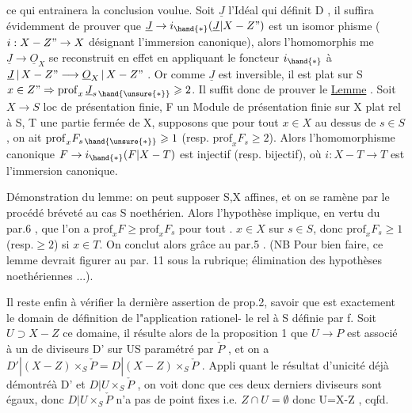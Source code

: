 
ce qui entrainera la conclusion voulue. Soit $\underline{J}$ l'Idéal qui définit
D , il suffira évidemment de prouver que $\underline{J}\to i_{\hand{*}}(\underline{J}|X-Z")$ est un isomor
phisme ($i:X-Z"\to X$ désignant l'immersion canonique), alors l'homomorphis
me $\underline{J}\to\underline{O}_X$ se reconstruit en effet en appliquant le foncteur $i_{\hand{*}}$ à
$\underline{J}\,|\,X-Z" \longrightarrow \underline{O}_X\,|\,X-Z"$ . Or comme $\underline{J}$ est inversible, il est plat sur S 
 $x\in Z" \Rightarrow \mathrm{prof}_x\,\underline{J}_{s\,\hand{\unsure{*}}} \geqslant 2$. Il suffit donc de prouver le
\uline{Lemme} . Soit $X\to S$ loc de présentation finie, F un Module de présentation
finie sur X plat rel à S, T une partie fermée de X, supposons que pour
tout $x\in X$ au dessus de $s\in S$, on ait \hand{\unsure{/}} $\mathrm{prof}_x F_{s\,\hand{\unsure{*}}}\geqslant 1$ (resp. $\mathrm{prof}_x F_s \geqslant 2$).
Alors l'homomorphisme canonique $F\to i_{\hand{*}}(F|X-T)$ est injectif (resp.
bijectif), où $i:X-T\to T$ est l'immersion canonique.

Démonstration du lemme: on peut supposer S,X affines, et on se
ramène par le procédé bréveté au cas S noethérien. Alors l'hypothèse
implique, en vertu du par.6 , que l'on a $\mathrm{prof}_x F \geqslant \mathrm{prof}_x F_s$ pour tout .
$x\in X$ sur $s\in S$, donc $\mathrm{prof}_x F_s \geqslant 1$ (resp.$\geqslant 2$) si $x\in T$. On conclut alors
grâce au par.5 . (NB Pour bien faire, ce lemme devrait figurer au par.
11 sous la rubrique; élimination des hypothèses noethériennes ...).

Il reste enfin à vérifier la dernière assertion de prop.2, savoir
que  est exactement le domain de définition de l"application rationel-%
le rel à S définie par f. Soit $U\supset X-Z$ ce domaine, il résulte alors de
la proposition 1 que $U\longrightarrow P$ est associé à un de diviseurs
D' sur U\unsure{/}S paramétré par $\check{P}$ , et on a $D'|(X-Z)\times_S\check{P} = D|(X-Z)\times_S\check{P}$ . Appli
quant le résultat d'unicité \hand{(}déjà démontré\hand{)}à D' et $D|U\times_S\check{P}$ , on voit donc
que ces deux derniers diviseurs sont égaux, donc $D|U\times_S\check{P}$ n'a pas de
point fixes i.e. $Z\cap U=\emptyset$ donc U=X-Z , cqfd.

